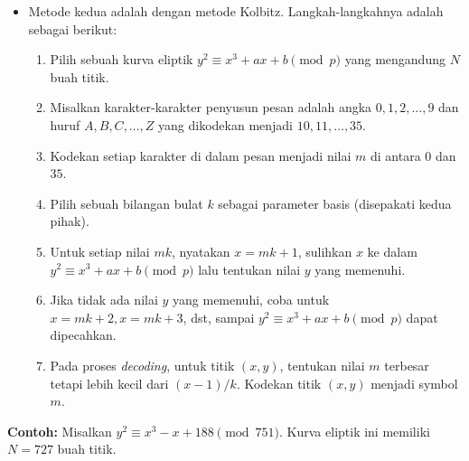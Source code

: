 \documentclass{article}
\begin{document}
\newpage


\begin{itemize}
    \item Metode kedua adalah dengan metode Kolbitz. Langkah-langkahnya adalah sebagai berikut:
    \begin{enumerate}
        \item Pilih sebuah kurva eliptik $y^2 \equiv x^3 + ax + b \pmod{p}$ yang mengandung $N$ buah titik.
        \item Misalkan karakter-karakter penyusun pesan adalah angka $0, 1, 2, \dots, 9$ dan huruf $A, B, C, \dots, Z$ yang dikodekan menjadi $10, 11, \dots, 35$.
        \item Kodekan setiap karakter di dalam pesan menjadi nilai $m$ di antara $0$ dan $35$.
        \item Pilih sebuah bilangan bulat $k$ sebagai parameter basis (disepakati kedua pihak).
        \item Untuk setiap nilai $mk$, nyatakan $x = mk + 1$, sulihkan $x$ ke dalam $y^2 \equiv x^3 + ax + b \pmod{p}$ lalu tentukan nilai $y$ yang memenuhi.
        \item Jika tidak ada nilai $y$ yang memenuhi, coba untuk $x = mk + 2, x = mk + 3$, dst, sampai $y^2 \equiv x^3 + ax + b \pmod{p}$ dapat dipecahkan.
        \item Pada proses \textit{decoding}, untuk titik $(x, y)$, tentukan nilai $m$ terbesar tetapi lebih kecil dari $(x - 1)/k$. Kodekan titik $(x, y)$ menjadi symbol $m$.
    \end{enumerate}
\end{itemize}

\newpage


\textbf{Contoh:} Misalkan $y^2 \equiv x^3 - x + 188 \pmod{751}$. Kurva eliptik ini memiliki $N = 727$ buah titik.
\end{document}
